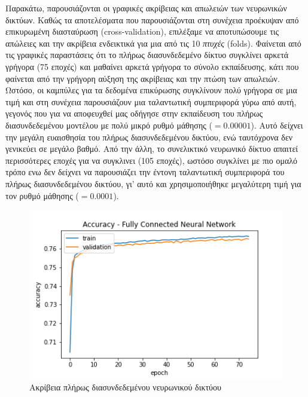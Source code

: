 \newpage
\medskip
Παρακάτω, παρουσιάζονται οι γραφικές ακρίβειας και απωλειών των νευρωνικών δικτύων. Καθώς τα αποτελέσματα που παρουσιάζονται στη συνέχεια προέκυψαν από επικυρωμένη διασταύρωση (cross-validation), επιλέξαμε να αποτυπώσουμε τις απώλειες και την ακρίβεια ενδεικτικά για μια από τις 10 \textit{πτυχές} (folds). Φαίνεται από τις γραφικές παραστάσεις ότι το πλήρως διασυνδεδεμένο δίκτυο συγκλίνει αρκετά γρήγορα (75 εποχές) και μαθαίνει αρκετά γρήγορα το σύνολο εκπαίδευσης, κάτι που φαίνεται από την γρήγορη αύξηση της ακρίβειας και την πτώση των απωλειών. Ωστόσο, οι καμπύλες για τα δεδομένα επικύρωσης συγκλίνουν πολύ γρήγορα σε μια τιμή και στη συνέχεια παρουσιάζουν μια ταλαντωτική συμπεριφορά γύρω από αυτή, γεγονός που για να αποφευχθεί μας οδήγησε στην εκπαίδευση του πλήρως διασυνδεδεμένου μοντέλου με πολύ μικρό ρυθμό μάθησης ($= 0.00001$). Αυτό δείχνει την μεγάλη ευαισθησία του πλήρως διασυνδεδεμένου δικτύου, ενώ ταυτόχρονα δεν γενικεύει σε μεγάλο βαθμό. Από την άλλη, το συνελικτικό νευρωνικό δίκτυο απαιτεί περισσότερες εποχές για να συγκλινει (105 εποχές), ωστόσο συγκλίνει με πιο ομαλό τρόπο ενω δεν δείχνει να παρουσιάζει την έντονη ταλαντωτική συμπεριφορά του πλήρως διασυνδεδεμένου δικτύου, γι' αυτό και χρησιμοποιήθηκε μεγαλύτερη τιμή για τον ρυθμό μάθησης ($= 0.0001$).

\begin{figure}[H]
  \centering
  \includegraphics[width=1\textwidth]{images/DNNacc.png}
  \caption{Ακρίβεια πλήρως διασυνδεδεμένου νευρωνικού δικτύου}
  \label{fig:DNNacc}
\end{figure}

